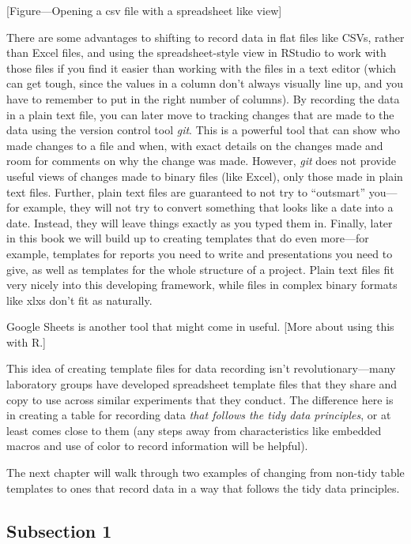 \documentclass[]{tufte-book}
\begin{document}
{[}Figure---Opening a csv file with a spreadsheet like view{]}

There are some advantages to shifting to record data in flat files like CSVs,
rather than Excel files, and using the spreadsheet-style view in RStudio to work
with those files if you find it easier than working with the files in a text
editor (which can get tough, since the values in a column don't always visually
line up, and you have to remember to put in the right number of columns). By
recording the data in a plain text file, you can later move to tracking changes
that are made to the data using the version control tool \emph{git}. This is a
powerful tool that can show who made changes to a file and when, with exact
details on the changes made and room for comments on why the change was made.
However, \emph{git} does not provide useful views of changes made to binary files
(like Excel), only those made in plain text files. Further, plain text files are
guaranteed to not try to ``outsmart'' you---for example, they will not try to
convert something that looks like a date into a date. Instead, they will leave
things exactly as you typed them in. Finally, later in this book we will build
up to creating templates that do even more---for example, templates for reports
you need to write and presentations you need to give, as well as templates for
the whole structure of a project. Plain text files fit very nicely into this
developing framework, while files in complex binary formats like xlxs don't fit
as naturally.

Google Sheets is another tool that might come in useful. {[}More about using this
with R.{]}

This idea of creating template files for data recording isn't
revolutionary---many laboratory groups have developed spreadsheet template files
that they share and copy to use across similar experiments that they conduct.
The difference here is in creating a table for recording data \emph{that follows the
tidy data principles}, or at least comes close to them (any steps away from
characteristics like embedded macros and use of color to record information will
be helpful).

The next chapter will walk through two examples of changing from non-tidy table
templates to ones that record data in a way that follows the tidy data
principles.

\hypertarget{subsection-1}{%
\subsection{Subsection 1}\label{subsection-1}}
\end{document}
